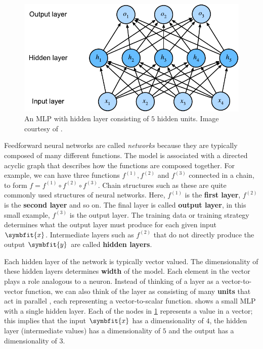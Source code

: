 % 
\begin{figure}
    \centering
    \includegraphics[scale=0.9]{chapters/assets/mlp.pdf}
    \caption{An MLP with hidden layer consisting of $5$ hidden units. Image courtesy of \textcite{zhang2021dive}.}
    \label{fig:mlp}
\end{figure}

Feedforward neural networks are called \textit{networks} because they are typically composed of many different functions. The model is associated with a directed acyclic graph that describes how the functions are composed together.
For example, we can have three functions \(f^{(1)}, f^{(2)}\) and $f^{(3)}$ connected in a chain, to form \(f = f^{(1)} \circ f^{(2)} \circ f^{(3)}\). 
Chain structures such as these are quite commonly used structures of neural networks. Here, $f^{(1)}$ is the \textbf{first layer}, $f^{(2)}$ is the \textbf{second layer} and so on. 
The final layer is called \textbf{output layer}, in this small example, $f^{(3)}$ is the output layer. The training data or training strategy determines what the output layer must produce for each given input $\symbfit{x}$.
Intermediate layers such as $f^{(2)}$ that do not directly produce the output $\symbfit{y}$ are called \textbf{hidden layers}.

Each hidden layer of the network is typically vector valued. The dimensionality of these hidden layers determines \textbf{width} of the model. Each element in the vector plays a role analogous to a neuron. Instead of thinking of a layer as a vector-to-vector function, we can also think of the layer as consisting of many \textbf{units} that act in parallel \parencite{Pinker1988}, each representing a vector-to-scalar function. 
 shows a small MLP with a single hidden layer. Each of the nodes in \cref{fig:mlp} represents a value in a vector; this implies that the input $\symbfit{x}$ has a dimensionality of $4$, the hidden layer (intermediate values) has a dimensionality of $5$ and the output has a dimensionality of $3$.

